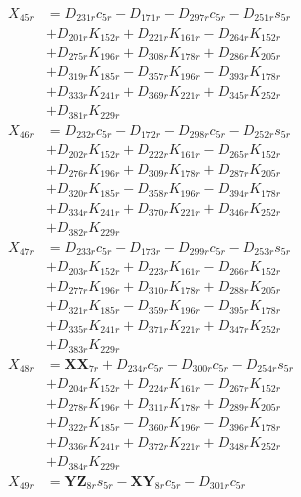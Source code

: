 \begin{multicols}{2}
\begin{align}
X_{45r} &= D_{231r}c_{5r} - D_{171r} - D_{297r}c_{5r} - D_{251r}s_{5r}  \nonumber \\
&+ D_{201r}K_{152r} + D_{221r}K_{161r} - D_{264r}K_{152r}  \nonumber \\
&+ D_{275r}K_{196r} + D_{308r}K_{178r} + D_{286r}K_{205r}  \nonumber \\
&+ D_{319r}K_{185r} - D_{357r}K_{196r} - D_{393r}K_{178r}  \nonumber \\
&+ D_{333r}K_{241r} + D_{369r}K_{221r} + D_{345r}K_{252r}  \nonumber \\
&+ D_{381r}K_{229r} \nonumber \\
X_{46r} &= D_{232r}c_{5r} - D_{172r} - D_{298r}c_{5r} - D_{252r}s_{5r}  \nonumber \\
&+ D_{202r}K_{152r} + D_{222r}K_{161r} - D_{265r}K_{152r}  \nonumber \\
&+ D_{276r}K_{196r} + D_{309r}K_{178r} + D_{287r}K_{205r}  \nonumber \\
&+ D_{320r}K_{185r} - D_{358r}K_{196r} - D_{394r}K_{178r}  \nonumber \\
&+ D_{334r}K_{241r} + D_{370r}K_{221r} + D_{346r}K_{252r}  \nonumber \\
&+ D_{382r}K_{229r} \nonumber \\
X_{47r} &= D_{233r}c_{5r} - D_{173r} - D_{299r}c_{5r} - D_{253r}s_{5r}  \nonumber \\
&+ D_{203r}K_{152r} + D_{223r}K_{161r} - D_{266r}K_{152r}  \nonumber \\
&+ D_{277r}K_{196r} + D_{310r}K_{178r} + D_{288r}K_{205r}  \nonumber \\
&+ D_{321r}K_{185r} - D_{359r}K_{196r} - D_{395r}K_{178r}  \nonumber \\
&+ D_{335r}K_{241r} + D_{371r}K_{221r} + D_{347r}K_{252r}  \nonumber \\
&+ D_{383r}K_{229r} \nonumber \\
X_{48r} &= \mathbf{XX}_{7r} + D_{234r}c_{5r} - D_{300r}c_{5r} - D_{254r}s_{5r}  \nonumber \\
&+ D_{204r}K_{152r} + D_{224r}K_{161r} - D_{267r}K_{152r}  \nonumber \\
&+ D_{278r}K_{196r} + D_{311r}K_{178r} + D_{289r}K_{205r}  \nonumber \\
&+ D_{322r}K_{185r} - D_{360r}K_{196r} - D_{396r}K_{178r}  \nonumber \\
&+ D_{336r}K_{241r} + D_{372r}K_{221r} + D_{348r}K_{252r}  \nonumber \\
&+ D_{384r}K_{229r} \nonumber \\
X_{49r} &= \mathbf{YZ}_{8r}s_{5r} - \mathbf{XY}_{8r}c_{5r} - D_{301r}c_{5r}  \nonumber \\

\end{align}
\end{multicols}
